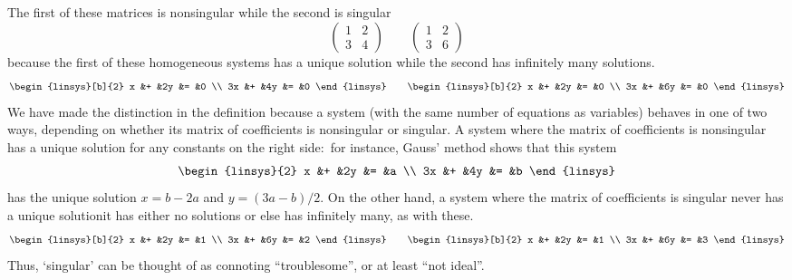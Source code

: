 \begin{example}
The first of these matrices is nonsingular while the second is singular
\begin{equation*}
  \begin{pmatrix}
    1  &2  \\
    3  &4
  \end{pmatrix}
  \qquad
  \begin{pmatrix}
    1  &2  \\
    3  &6
  \end{pmatrix}
\end{equation*}
because the first of these homogeneous systems has a unique solution 
while the second has infinitely many solutions.
\begin{equation*}
  \begin{linsys}[b]{2}
    x &+  &2y  &=  &0  \\
   3x &+  &4y  &=  &0  
  \end{linsys}
  \qquad
  \begin{linsys}[b]{2}
    x &+  &2y  &=  &0  \\
   3x &+  &6y  &=  &0
  \end{linsys}
\end{equation*}  
We have made the distinction in the definition because a system
(with the same number of equations as variables)
behaves in one of two ways, depending on whether its matrix of coefficients
is nonsingular or singular.
A system where the matrix of coefficients is nonsingular 
has a unique solution for any constants on the right 
side:~for instance, Gauss' method shows that this system
\begin{equation*}
  \begin{linsys}{2}
    x  &+  &2y  &=  &a \\
    3x &+  &4y  &=  &b
  \end{linsys}
\end{equation*}
has the unique solution $x=b-2a$ and  $y=(3a-b)/2$.
On the other hand, a system where the matrix of coefficients is
singular never has a unique solution\Dash it 
has either no solutions or else has infinitely many, as with these.
\begin{equation*}
  \begin{linsys}[b]{2}
    x  &+  &2y  &=   &1   \\
   3x  &+  &6y  &=   &2   
  \end{linsys}
  \qquad
  \begin{linsys}[b]{2}
    x  &+  &2y  &=   &1   \\
   3x  &+  &6y  &=   &3
  \end{linsys}
\end{equation*} 
Thus, `singular' can be thought of as connoting 
``troublesome'', or at least ``not ideal''.
\end{example}

